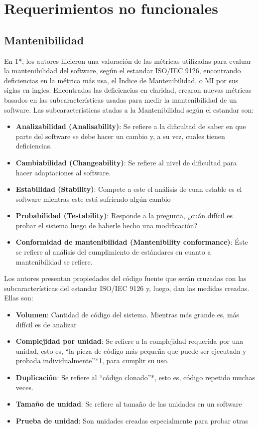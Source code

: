 \section{Requerimientos no funcionales}
\subsection{Mantenibilidad}

En 1*, los autores hicieron una valoración de las métricas utilizadas para evaluar la mantenibilidad del software, según el estandar ISO/IEC 9126, encontrando deficiencias en la métrica más usa, el Indice de Mantenibilidad, o MI por sus siglas en ingles. Encontradas las deficiencias en claridad, crearon nuevas métricas basados en las subcaracterísticas usadas para medir la mantenibilidad de un software. Las subcaracterísticas atadas a la Mantenibilidad según el estandar son:

\begin{itemize}
 \item \textbf{Analizabilidad (Analisability)}: Se refiere a la dificultad de saber en que parte del software se debe hacer un cambio y, a su vez, cuales tienen deficiencias.
 \item \textbf{Cambiabilidad (Changeability)}: Se refiere al nivel de dificultad para hacer adaptaciones al software.
 \item \textbf{Estabilidad (Stability)}: Compete a este el análisis de cuan estable es el software mientras este está sufriendo algún cambio
 \item \textbf{Probabilidad (Testability)}: Responde a la pregunta, ¿cuán difícil es probar el sistema luego de haberle hecho una modificación?
 \item \textbf{Conformidad de mantenibilidad (Mantenibility conformance)}: Éste se refiere al análisis del cumplimiento de estándares en cuanto a mantenibilidad se refiere.
\end{itemize}

Los autores presentan propiedades del código fuente que serán cruzadas con las subcaracterísticas del estandar ISO/IEC 9126 y, luego, dan las medidas creadas. Ellas son:

\begin{itemize}
 \item \textbf{Volumen}: Cantidad de código del sistema. Mientras más grande es, más difícil es de analizar
 \item \textbf{Complejidad por unidad}: Se refiere a la complejidad requerida por una unidad, esto es, “la pieza de código más pequeña que puede ser ejecutada y probada individualmente”*1, para cumplir su uso.
 \item \textbf{Duplicación}: Se refiere al “código clonado”*, esto es, código repetido muchas veces.
 \item \textbf{Tamaño de unidad}: Se refiere al tamaño de las unidades en un software
 \item \textbf{Prueba de unidad}: Son unidades creadas especialmente para probar otras
\end{itemize}

